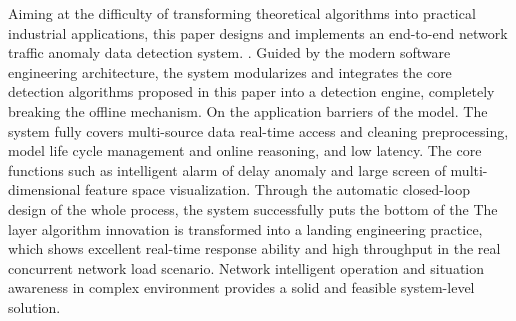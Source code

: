 \begin{eabstract}
    Aiming at the difficulty of transforming theoretical algorithms into practical industrial applications, this paper designs and implements an end-to-end network traffic anomaly data detection system. 
    . Guided by the modern software engineering architecture, the system modularizes and integrates the core detection algorithms proposed in this paper into a detection engine, completely breaking the offline mechanism. 
    On the application barriers of the model. The system fully covers multi-source data real-time access and cleaning preprocessing, model life cycle management and online reasoning, and low latency. 
    The core functions such as intelligent alarm of delay anomaly and large screen of multi-dimensional feature space visualization. Through the automatic closed-loop design of the whole process, the system successfully puts the bottom of the 
    The layer algorithm innovation is transformed into a landing engineering practice, which shows excellent real-time response ability and high throughput in the real concurrent network load scenario. 
    Network intelligent operation and situation awareness in complex environment provides a solid and feasible system-level solution.
        
\end{eabstract}
